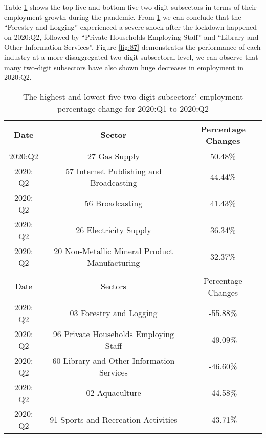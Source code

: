\documentclass{monashthesis}
\begin{document}
Table \ref{tab:comp} shows the top five and bottom five two-digit subsectors in terms of their employment growth during the pandemic. From \ref{tab:comp} we can conclude that the ``Forestry and Logging'' experienced a severe shock after the lockdown happened on 2020:Q2, followed by ``Private Households Employing Staff'' and ``Library and Other Information Services''. Figure \ref{fig:87} demonstrates the performance of each industry at a more disaggregated two-digit subsectoral level, we can observe that many two-digit subsectors have also shown huge decreases in employment in 2020:Q2.

\begin{table}
\begin{center}
\begin{tabular}{ccc}
\hline
Date     & Sector                                        & Percentage Changes \\
\hline
2020:Q2  & 27 Gas Supply                                 & 50.48\%                                \\
2020: Q2 & 57 Internet Publishing and Broadcasting       & 44.44\%                                \\
2020: Q2 & 56 Broadcasting                               & 41.43\%                                \\
2020: Q2 & 26 Electricity Supply                         & 36.34\%                                \\
2020: Q2 & 20 Non-Metallic Mineral Product Manufacturing & 32.37\% 
                 \\
                 \\
                 \hline
Date     &  Sectors                                      &Percentage Changes\\
                 \hline
2020: Q2 & 03 Forestry and Logging                   &-55.88\%  
                 \\
2020: Q2 & 96 Private Households Employing Staff     & -49.09\% 
                 \\
2020: Q2 & 60 Library and Other Information Services & -46.60\% 
                 \\
2020: Q2 & 02 Aquaculture                                & -44.58\%  
                 \\
2020: Q2 & 91 Sports and Recreation Activities           & -43.71\%
\end{tabular}
\end{center}
\caption{The highest and lowest five two-digit subsectors' employment percentage change for 2020:Q1 to 2020:Q2 }
\label{tab:comp}
\end{table}
\end{document}
